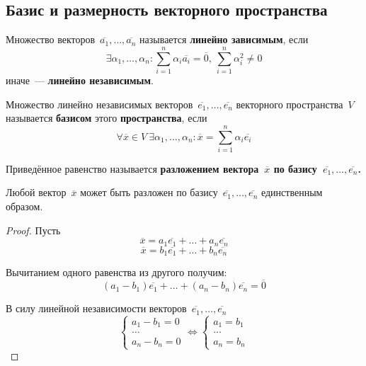 \subsection{Базис и размерность векторного пространства}
Множество векторов~$\overline{a_1}, \ldots, \overline{a_n}$ называется \textbf{линейно зависимым}, если
\begin{equation*}
\exists \alpha_1, \ldots, \alpha_n \colon
\sum_{i=1}^n \alpha_i \overline{a_i} = \overline 0, \
\sum_{i=1}^n \alpha_i^2 \neq 0
\end{equation*}
иначе~--- \textbf{линейно независимым}.

Множество линейно независимых векторов~$\overline{e_1}, \ldots, \overline{e_n}$ векторного пространства~$V$ называется \textbf{базисом} этого \textbf{пространства}, если
\begin{equation*}
\forall \overline x \in V \
\exists \alpha_1, \ldots, \alpha_n \colon
\overline x = \sum_{i=1}^n \alpha_i \overline{e_i}
\end{equation*}

Приведённое равенство называется \textbf{разложением вектора~$\overline x$ по базису~$\overline{e_1}, \ldots, \overline{e_n}$.}

\begin{theorem}[о~базисе]
Любой вектор~$\overline x$ может быть разложен по базису~$\overline{e_1}, \ldots, \overline{e_n}$ единственным образом.
\end{theorem}
\begin{proof}
Пусть
\begin{equation*}
\overline x = a_1 \overline{e_1} + \ldots + a_n \overline{e_n}
\end{equation*}
\begin{equation*}
\overline x = b_1 \overline{e_1} + \ldots + b_n \overline{e_n}
\end{equation*}

Вычитанием одного равенства из другого получим:
\begin{equation*}
(a_1 - b_1) \overline{e_1} + \ldots + (a_n - b_n) \overline{e_n} = \overline 0
\end{equation*}

В силу линейной независимости векторов~$\overline{e_1}, \ldots, \overline{e_n}$
\begin{equation*}
\begin{cases}
a_1 - b_1 = 0 \\
\ldots \\
a_n - b_n = 0
\end{cases}
\Leftrightarrow
\begin{cases}
a_1 = b_1 \\
\ldots \\
a_n = b_n
\end{cases}
\end{equation*}
\end{proof}

